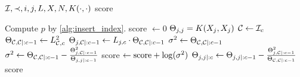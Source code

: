 \begin{algorithmic}[1]
  \REQUIRE \( \mathcal{I}, \prec, i, j, L, X, N, K(\cdot, \cdot) \)
  \ENSURE score

  \STATE Compute \( p \) by \cref{alg:insert_index}.
  \STATE score \( \gets 0 \)
  \STATE \( \Theta_{j, j} = K(X_j, X_j) \)
    \STATE \( \mathcal{C} \gets \mathcal{I}_c \)
    \STATE \( \Theta_{\mathcal{C}, \mathcal{C} \mid :c - 1}
      \gets L_{\mathcal{C}, c}^2
    \)
    \STATE \( \Theta_{j, \mathcal{C} \mid :c - 1}
      \gets L_{j, c} \cdot \Theta_{\mathcal{C}, \mathcal{C} \mid :c - 1}
    \)
      \STATE \( \sigma^2 \gets \Theta_{\mathcal{C}, \mathcal{C} \mid :c - 1} \)
        \STATE \( \sigma^2 \gets
          \Theta_{\mathcal{C}, \mathcal{C} \mid :c - 1} -
          \frac{\Theta_{j, \mathcal{C} \mid :c - 1}^2}{\Theta_{j, j \mid :c - 1}}
        \)
      \ENDIF
      \STATE score \( \gets \text{score} + \log(\sigma^2) \)
    \ENDIF
    \STATE \( \Theta_{j, j \mid :c} \gets \Theta_{j, j \mid :c - 1} -
      \frac{\Theta_{j, \mathcal{C} \mid :c - 1}^2}
           {\Theta_{\mathcal{C}, \mathcal{C} \mid :c - 1}}
    \)
  \ENDFOR
  \RETURN score
\end{algorithmic}
